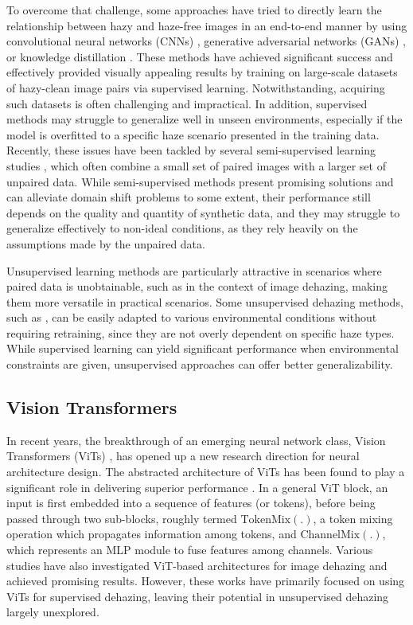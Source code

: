 To overcome that challenge, some approaches have tried to directly learn the relationship between hazy and haze-free images in an end-to-end manner by using convolutional neural networks (CNNs) \cite{qin2020ffa}, generative adversarial networks (GANs) \cite{dong2020fd,tran2024encoder}, or knowledge distillation \cite{hong2020distilling,tran2024lightweight}. These methods have achieved significant success and effectively provided visually appealing results by training on large-scale datasets of hazy-clean image pairs via supervised learning. Notwithstanding, acquiring such datasets is often challenging and impractical. In addition, supervised methods may struggle to generalize well in unseen environments, especially if the model is overfitted to a specific haze scenario presented in the training data. Recently, these issues have been tackled by several semi-supervised learning studies \cite{li2019semi,an2022semi}, which often combine a small set of paired images with a larger set of unpaired data. While semi-supervised methods present promising solutions and can alleviate domain shift problems to some extent, their performance still depends on the quality and quantity of synthetic data, and they may struggle to generalize effectively to non-ideal conditions, as they rely heavily on the assumptions made by the unpaired data.

Unsupervised learning methods are particularly attractive in scenarios where paired data is unobtainable, such as in the context of image dehazing, making them more versatile in practical scenarios. Some unsupervised dehazing methods, such as \cite{engin2018cycle,li2021you,zhao2021refinednet}, can be easily adapted to various environmental conditions without requiring retraining, since they are not overly dependent on specific haze types. While supervised learning can yield significant performance when environmental constraints are given, unsupervised approaches can offer better generalizability. 


\subsection{Vision Transformers}
\label{subsec:vit}

In recent years, the breakthrough of an emerging neural network class, Vision Transformers (ViTs) \cite{dosovitskiy2020image}, has opened up a new research direction for neural architecture design. The abstracted architecture of ViTs has been found to play a significant role in delivering superior performance \cite{yu2022metaformer}. In a general ViT block, an input is first embedded into a sequence of features (or tokens), before being passed through two sub-blocks, roughly termed $\mathrm{TokenMix}(.)$, a token mixing operation which propagates information among tokens, and $\mathrm{ChannelMix}(.)$, which represents an MLP module to fuse features among channels. Various studies \cite{guo2022image,song2023vision,tran2024distilled} have also investigated ViT-based architectures for image dehazing and achieved promising results. However, these works have primarily focused on using ViTs for supervised dehazing, leaving their potential in unsupervised dehazing largely unexplored.


